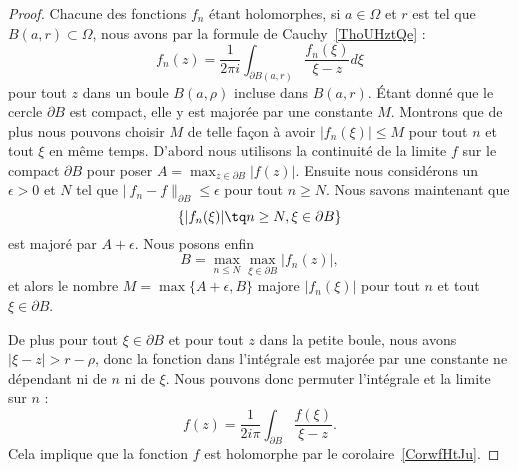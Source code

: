 \begin{proof}
    Chacune des fonctions \( f_n\) étant holomorphes, si \( a\in \Omega\) et \( r\) est tel que \( B(a,r)\subset \Omega\), nous avons par la formule de Cauchy~\ref{ThoUHztQe} :
    \begin{equation}
        f_n(z)=\frac{1}{ 2\pi i }\int_{\partial B(a,r)}\frac{ f_n(\xi) }{ \xi-z }d\xi
    \end{equation}
    pour tout \( z\) dans un boule \( B(a,\rho)\) incluse dans \( B(a,r)\). Étant donné que le cercle \( \partial B\) est compact, elle y est majorée par une constante \( M\). Montrons que de plus nous pouvons choisir \( M\) de telle façon à avoir \( | f_n(\xi) |\leq M\) pour tout \( n\) et tout \( \xi\) en même temps. D'abord nous utilisons la continuité de la limite \( f\) sur le compact \( \partial B \) pour poser \( A=\max_{z\in\partial B}| f(z) |\). Ensuite nous considérons un \( \epsilon>0\) et \( N\) tel que \( |\ f_n-f \|_{\partial B}\leq \epsilon\) pour tout \( n\geq N\). Nous savons maintenant que
    \begin{equation}
        \{ | f_n(\xi) |\tq n \geq N,\xi\in\partial B \}
    \end{equation}
    est majoré par \( A+\epsilon\). Nous posons enfin
    \begin{equation}
        B=\max_{n\leq N}\max_{\xi\in\partial B}| f_n(z) |,
    \end{equation}
    et alors le nombre \( M=\max\{ A+\epsilon,B \}\) majore \( | f_n(\xi) |\) pour tout \( n\) et tout \( \xi\in\partial B\).

    De plus pour tout \( \xi\in\partial B\) et pour tout \( z\) dans la petite boule, nous avons \( | \xi-z |>r-\rho\), donc  la fonction dans l'intégrale est majorée par une constante ne dépendant ni de \( n\) ni de \( \xi\). Nous pouvons donc permuter l'intégrale et la limite sur \( n\) :
    \begin{equation}
        f(z)=\frac{1}{ 2i\pi }\int_{\partial B}\frac{ f(\xi) }{ \xi-z }.
    \end{equation}
    Cela implique que la fonction \( f\) est holomorphe par le corolaire~\ref{CorwfHtJu}.


\end{proof}

